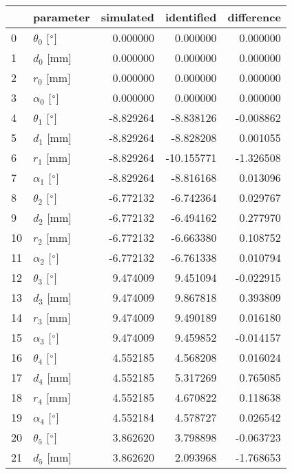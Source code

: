 \documentclass{standalone}%
\begin{document}
%
\normalsize%
\begin{tabular}{llrrr}
\toprule
{} &                 parameter & simulated & identified & difference \\
\midrule
0  &  $\theta_{0}$ [$\degree$] &  0.000000 &   0.000000 &   0.000000 \\
1  &              $d_{0}$ [mm] &  0.000000 &   0.000000 &   0.000000 \\
2  &              $r_{0}$ [mm] &  0.000000 &   0.000000 &   0.000000 \\
3  &  $\alpha_{0}$ [$\degree$] &  0.000000 &   0.000000 &   0.000000 \\
4  &  $\theta_{1}$ [$\degree$] & -8.829264 &  -8.838126 &  -0.008862 \\
5  &              $d_{1}$ [mm] & -8.829264 &  -8.828208 &   0.001055 \\
6  &              $r_{1}$ [mm] & -8.829264 & -10.155771 &  -1.326508 \\
7  &  $\alpha_{1}$ [$\degree$] & -8.829264 &  -8.816168 &   0.013096 \\
8  &  $\theta_{2}$ [$\degree$] & -6.772132 &  -6.742364 &   0.029767 \\
9  &              $d_{2}$ [mm] & -6.772132 &  -6.494162 &   0.277970 \\
10 &              $r_{2}$ [mm] & -6.772132 &  -6.663380 &   0.108752 \\
11 &  $\alpha_{2}$ [$\degree$] & -6.772132 &  -6.761338 &   0.010794 \\
12 &  $\theta_{3}$ [$\degree$] &  9.474009 &   9.451094 &  -0.022915 \\
13 &              $d_{3}$ [mm] &  9.474009 &   9.867818 &   0.393809 \\
14 &              $r_{3}$ [mm] &  9.474009 &   9.490189 &   0.016180 \\
15 &  $\alpha_{3}$ [$\degree$] &  9.474009 &   9.459852 &  -0.014157 \\
16 &  $\theta_{4}$ [$\degree$] &  4.552185 &   4.568208 &   0.016024 \\
17 &              $d_{4}$ [mm] &  4.552185 &   5.317269 &   0.765085 \\
18 &              $r_{4}$ [mm] &  4.552185 &   4.670822 &   0.118638 \\
19 &  $\alpha_{4}$ [$\degree$] &  4.552184 &   4.578727 &   0.026542 \\
20 &  $\theta_{5}$ [$\degree$] &  3.862620 &   3.798898 &  -0.063723 \\
21 &              $d_{5}$ [mm] &  3.862620 &   2.093968 &  -1.768653 \\

\end{tabular}
\end{document}
